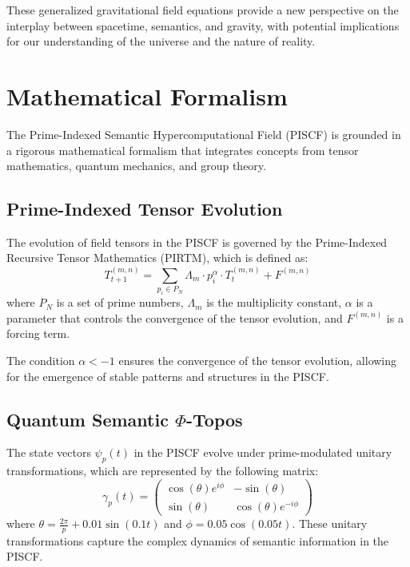 \documentclass{article}
\theoremstyle{plain}
\begin{document}
These generalized gravitational field equations provide a new perspective on the interplay between spacetime, semantics, and gravity, with potential implications for our understanding of the universe and the nature of reality.


\section{Mathematical Formalism}

The Prime-Indexed Semantic Hypercomputational Field (PISCF) is grounded in a rigorous mathematical formalism that integrates concepts from tensor mathematics, quantum mechanics, and group theory.

\subsection{Prime-Indexed Tensor Evolution}

The evolution of field tensors in the PISCF is governed by the Prime-Indexed Recursive Tensor Mathematics (PIRTM), which is defined as:
\begin{equation}
T_{t+1}^{(m,n)} = \sum_{p_i \in P_N} \Lambda_m \cdot p_i^\alpha \cdot T_t^{(m,n)} + F^{(m,n)}
\end{equation}
where $P_N$ is a set of prime numbers, $\Lambda_m$ is the multiplicity constant, $\alpha$ is a parameter that controls the convergence of the tensor evolution, and $F^{(m,n)}$ is a forcing term.

The condition $\alpha < -1$ ensures the convergence of the tensor evolution, allowing for the emergence of stable patterns and structures in the PISCF.

\subsection{Quantum Semantic $\Phi$-Topos}

The state vectors $\psi_p(t)$ in the PISCF evolve under prime-modulated unitary transformations, which are represented by the following matrix:
\begin{equation}
\gamma_p(t) = \begin{pmatrix}
\cos(\theta) e^{i \phi} & -\sin(\theta) \\
\sin(\theta) & \cos(\theta) e^{-i \phi}
\end{pmatrix}
\end{equation}
where $\theta = \frac{2\pi}{p} + 0.01 \sin(0.1t)$ and $\phi = 0.05 \cos(0.05t)$. These unitary transformations capture the complex dynamics of semantic information in the PISCF.
\end{document}
